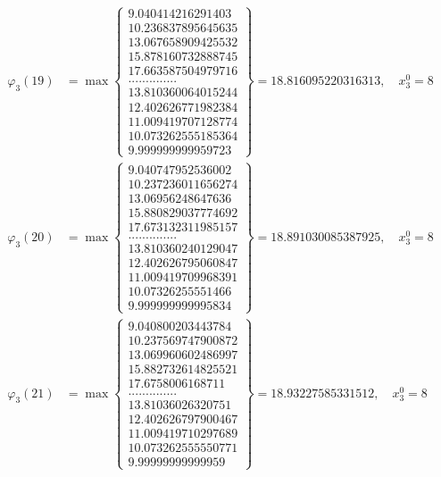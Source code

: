 \documentclass{article}
\begin{document}
\begin{align*}
  
  
  
\varphi_{3}(19) &= \max \left\{ \begin{array}{c}
9.040414216291403 \\
 10.236837895645635 \\
 13.067658909425532 \\
 15.878160732888745 \\
 17.663587504979716 \\
 .............. \\
 13.810360064015244 \\
 12.402626771982384 \\
 11.009419707128774 \\
 10.073262555185364 \\
 9.999999999959723
\end{array} \right\} = 18.816095220316313, \quad x_{3}^0 = 8\\
  
  
  
  
\varphi_{3}(20) &= \max \left\{ \begin{array}{c}
9.040747952536002 \\
 10.237236011656274 \\
 13.06956248647636 \\
 15.880829037774692 \\
 17.673132311985157 \\
 .............. \\
 13.810360240129047 \\
 12.402626795060847 \\
 11.009419709968391 \\
 10.07326255551466 \\
 9.999999999995834
\end{array} \right\} = 18.891030085387925, \quad x_{3}^0 = 8\\
  
  
  
  
\varphi_{3}(21) &= \max \left\{ \begin{array}{c}
9.040800203443784 \\
 10.237569747900872 \\
 13.069960602486997 \\
 15.882732614825521 \\
 17.6758006168711 \\
 .............. \\
 13.81036026320751 \\
 12.402626797900467 \\
 11.009419710297689 \\
 10.073262555550771 \\
 9.99999999999959
\end{array} \right\} = 18.93227585331512, \quad x_{3}^0 = 8\\
  

\end{align*}
\end{document}
